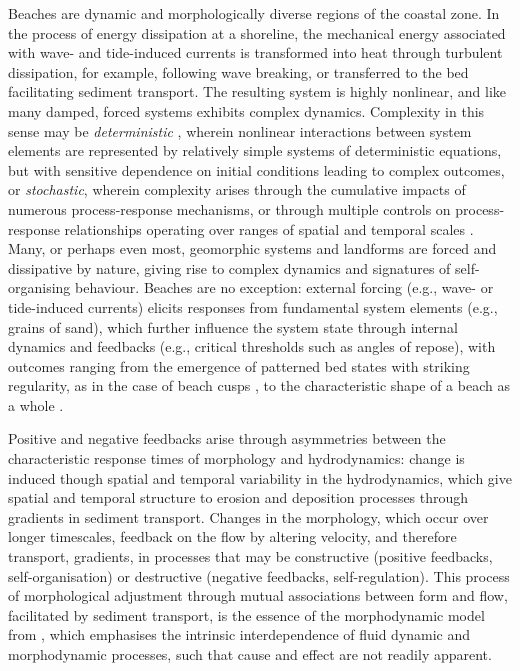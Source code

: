 Beaches are dynamic and morphologically diverse regions of the coastal zone. In the process of energy dissipation at a shoreline, the mechanical energy associated with wave- and tide-induced currents is transformed into heat through turbulent dissipation, for example, following wave breaking, or transferred to the bed facilitating sediment transport. The resulting system is highly nonlinear, and like many damped, forced systems exhibits complex dynamics. Complexity in this sense may be \textit{deterministic} \citep[e.g.,][]{Lorenz1963}, wherein nonlinear interactions between system elements are represented by relatively simple systems of deterministic equations, but with sensitive dependence on initial conditions leading to complex outcomes, or \textit{stochastic}, wherein complexity arises through the cumulative impacts of numerous process-response mechanisms, or through multiple controls on process-response relationships operating over ranges of spatial and temporal scales \citep{Phillips1992}. Many, or perhaps even most, geomorphic systems and landforms are forced and dissipative by nature, giving rise to complex dynamics and signatures of self-organising behaviour. Beaches are no exception: external forcing (e.g., wave- or tide-induced currents) elicits responses from fundamental system elements (e.g., grains of sand), which further influence the system state through internal dynamics and feedbacks (e.g., critical thresholds such as angles of repose), with outcomes ranging from the emergence of patterned bed states with striking regularity, as in the case of beach cusps \citep[e.g.,][]{Werner_Fink1993, Coco_etal2000}, to the characteristic shape of a beach as a whole \citep[i.e., its profile:][]{Dean1991, Turner1995}. 

Positive and negative feedbacks arise through asymmetries between the characteristic response times of morphology and hydrodynamics: change is induced though spatial and temporal variability in the hydrodynamics, which give spatial and temporal structure to erosion and deposition processes through gradients in sediment transport. Changes in the morphology, which occur over longer timescales, feedback on the flow by altering velocity, and therefore transport, gradients, in processes that may be constructive (positive feedbacks, self-organisation) or destructive (negative feedbacks, self-regulation). This process of morphological adjustment through mutual associations between form and flow, facilitated by sediment transport, is the essence of the morphodynamic model from \citet{Wright_Thom1977}, which emphasises the intrinsic interdependence of fluid dynamic and morphodynamic processes, such that cause and effect are not readily apparent.

